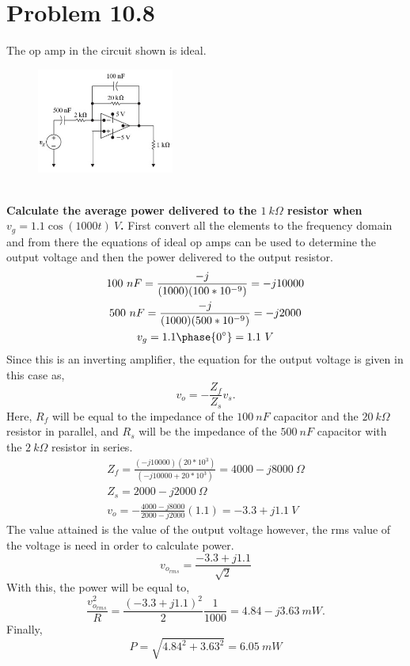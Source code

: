 \documentclass[12pt]{article}
\begin{document}
    \section*{Problem 10.8}
    The op amp in the circuit shown is ideal.
    \begin{figure}[h]
        \centering
        \includegraphics[width=0.4\textwidth]{10.8 Circuit.png}
    \end{figure}
    \\ \textbf{Calculate the average power delivered to the $1\ k \Omega$ resistor
    when $v_{g} = 1.1 \cos (1000t)\ V$.}
    First convert all the elements to the frequency domain and from there the
    equations of ideal op amps can be used to determine the output voltage and
    then the power delivered to the output resistor. \\
    \begin{gather*}
        100\ nF = \frac{-j}{(1000)(100*10^{-9})} = -j 10000 \\
        500\ nF = \frac{-j}{(1000)(500*10^{-9})} = -j 2000 \\
        v_{g} = 1.1 \phase{0^{\circ}} = 1.1\ V
    \end{gather*}
    Since this is an inverting amplifier, the equation for the output voltage is
    given in this case as,
    \[
        v_{o} = -\frac{Z_{f}}{Z_{s}} v_{s}
    .\]
    Here, $R_{f}$ will be equal to the impedance of the $100\ nF$ capacitor and
    the $20\ k \Omega$ resistor in parallel, and $R_{s}$ will be the impedance
    of the $500\ nF$ capacitor with the $2\ k\Omega$ resistor in series.
    \begin{gather*}
        Z_{f} = \frac{(-j 10000)(20*10^{3})}{(-j 10000 + 20*10^{3})} = 4000 - j
        8000\ \Omega \\
        Z_{s} = 2000 - j 2000\ \Omega \\
        v_{o} = - \frac{4000 - j 8000}{2000 - j 2000} (1.1) = -3.3 + j 1.1\ V
    \end{gather*}
    The value attained is the value of the output voltage however, the rms value
    of the voltage is need in order to calculate power.
    \[
        v_{o_{rms}} = \frac{-3.3 + j 1.1}{\sqrt{2}}
    \]
    With this, the power will be equal to,
    \[
        \frac{v_{o_{rms}}^2}{R} = \frac{(-3.3 + j 1.1)^2}{2} \frac{1}{1000} =
        4.84 - j 3.63\ mW
    .\]
    Finally,
    \[
        P = \sqrt{4.84^2 + 3.63^2} = \boxed{6.05\ mW}
    \]
\end{document}
